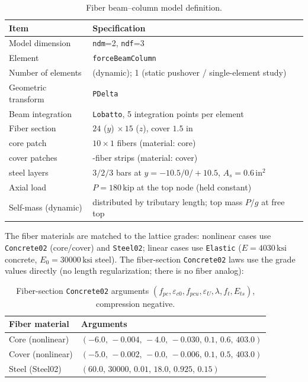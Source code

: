 \documentclass[11pt]{article}
\newcommand{\unit}[1]{\,\mathrm{#1}}
\newcommand{\code}[1]{\texttt{#1}}
\begin{document}
\begin{table}[H]
\centering
\caption{Fiber beam--column model definition.}
\begin{tabular}{>{\raggedright\arraybackslash}p{4.4cm} >{\raggedright\arraybackslash}p{10.8cm}}
\toprule
Item & Specification \\
\midrule
Model dimension          & \code{ndm}=2, \code{ndf}=3 \\
Element                   & \code{forceBeamColumn} \\
Number of elements       & 96 (dynamic); 1 (static pushover / single-element study) \\
Geometric transform      & \code{PDelta} \\
Beam integration         & \code{Lobatto}, 5 integration points per element \\
Fiber section            & $24$ ($y$) $\times\,15$ ($z$), cover $1.5$ in \\
\quad core patch         & $10\times1$ fibers (material: core) \\
\quad cover patches      & 1-fiber strips (material: cover) \\
\quad steel layers       & $3 / 2 / 3$ bars at $y=-10.5 / 0 / +10.5$, $A_s=0.6\unit{in^2}$ \\
Axial load               & $P=180\unit{kip}$ at the top node (held constant) \\
Self-mass (dynamic)      & distributed by tributary length; top mass $P/g$ at free top \\
\bottomrule
\end{tabular}
\end{table}

The fiber materials are matched to the lattice grades: nonlinear cases use \code{Concrete02}
(core/cover) and \code{Steel02}; linear cases use \code{Elastic} ($E=4030\unit{ksi}$ concrete,
$E_0=30000\unit{ksi}$ steel). The fiber-section \code{Concrete02} laws use the grade values
directly (no length regularization; there is no fiber analog):

\begin{table}[H]
\centering
\caption{Fiber-section \code{Concrete02} arguments
$(f_{pc},\varepsilon_{c0},f_{pcu},\varepsilon_{U},\lambda,f_t,E_{ts})$, compression negative.}
\begin{tabular}{l l}
\toprule
Fiber material & Arguments \\
\midrule
Core  (nonlinear) & $(-6.0,\,-0.004,\,-4.0,\,-0.030,\,0.1,\,0.6,\,403.0)$ \\
Cover (nonlinear) & $(-5.0,\,-0.002,\,-0.0,\,-0.006,\,0.1,\,0.5,\,403.0)$ \\
Steel (Steel02)   & $(60.0,\,30000,\,0.01,\,18.0,\,0.925,\,0.15)$ \\
\bottomrule
\end{tabular}
\end{table}
\end{document}
